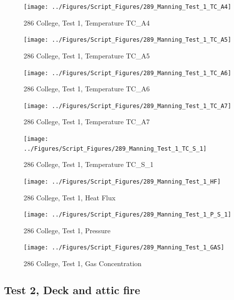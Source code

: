 \documentclass[12pt,oneside]{book}
\begin{document}
\begin{figure}[!ht]
\texttt{[image: ../Figures/Script\_Figures/289\_Manning\_Test\_1\_TC\_A4]}
\caption{286 College, Test 1, Temperature TC\_A4}
\label{fig:289_Manning_Test_1_TC_A4}
\end{figure}

\begin{figure}[!ht]
\texttt{[image: ../Figures/Script\_Figures/289\_Manning\_Test\_1\_TC\_A5]}
\caption{286 College, Test 1, Temperature TC\_A5}
\label{fig:289_Manning_Test_1_TC_A5}
\end{figure}

\begin{figure}[!ht]
\texttt{[image: ../Figures/Script\_Figures/289\_Manning\_Test\_1\_TC\_A6]}
\caption{286 College, Test 1, Temperature TC\_A6}
\label{fig:289_Manning_Test_1_TC_A6}
\end{figure}

\begin{figure}[!ht]
\texttt{[image: ../Figures/Script\_Figures/289\_Manning\_Test\_1\_TC\_A7]}
\caption{286 College, Test 1, Temperature TC\_A7}
\label{fig:289_Manning_Test_1_TC_A7}
\end{figure}

\begin{figure}[!ht]
\texttt{[image: ../Figures/Script\_Figures/289\_Manning\_Test\_1\_TC\_S\_1]}
\caption{286 College, Test 1, Temperature TC\_S\_1}
\label{fig:289_Manning_Test_1_TC_S_1}
\end{figure}

\begin{figure}[!ht]
\texttt{[image: ../Figures/Script\_Figures/289\_Manning\_Test\_1\_HF]}
\caption{286 College, Test 1, Heat Flux}
\label{fig:289_Manning_Test_1_HF}
\end{figure}

\begin{figure}[!ht]
\texttt{[image: ../Figures/Script\_Figures/289\_Manning\_Test\_1\_P\_S\_1]}
\caption{286 College, Test 1, Pressure}
\label{fig:289_Manning_Test_1_P_S_1}
\end{figure}

\begin{figure}[!ht]
\texttt{[image: ../Figures/Script\_Figures/289\_Manning\_Test\_1\_GAS]}
\caption{286 College, Test 1, Gas Concentration}
\label{fig:289_Manning_Test_1_GAS}
\end{figure}


\clearpage


\subsection{Test 2, Deck and attic fire}
\end{document}
